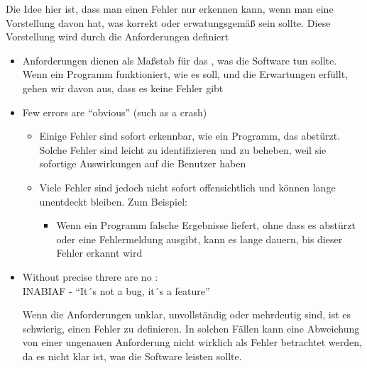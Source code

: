 \begin{defBox}[title=Detection an Error Presumes an Expectation (Requirement)]
    \begin{infoBox}
        Die Idee hier ist, dass man einen Fehler nur erkennen kann, wenn man eine Vorstellung davon hat, was korrekt oder erwatungsgemäß sein sollte. Diese Vorstellung wird durch die Anforderungen definiert
        \begin{itemize}
            \item {} Anforderungen dienen als Maßstab für das , was die Software tun sollte. Wenn ein Programm funktioniert, wie es soll, und die Erwartungen erfüllt, gehen wir davon aus, dass es keine Fehler gibt
        \end{itemize}
    \end{infoBox}
    \begin{itemize}
        \item Few errors are \enquote{obvious} (such as a crash)
        \begin{infoBox}
            \begin{itemize}
                \item {} Einige Fehler sind sofort erkennbar, wie ein Programm, das abstürzt. Solche Fehler sind leicht zu identifizieren und zu beheben, weil sie sofortige Auswirkungen auf die Benutzer haben
                \item {} Viele Fehler sind jedoch nicht sofort offensichtlich und können lange unentdeckt bleiben. Zum Beispiel:
                \begin{itemize}
                    \item {} Wenn ein Programm falsche Ergebnisse liefert, ohne dass es abstürzt oder eine Fehlermeldung ausgibt, kann es lange dauern, bis dieser Fehler erkannt wird
                \end{itemize}
            \end{itemize}
        \end{infoBox}
        \item Without precise  threre are no :\\
        INABIAF - \enquote{It´s not a bug, it´s a feature}
        \begin{infoBox}
            Wenn die Anforderungen unklar, unvollständig oder mehrdeutig sind, ist es schwierig, einen Fehler zu definieren. In solchen Fällen kann eine Abweichung von einer ungenauen Anforderung nicht wirklich als Fehler betrachtet werden, da es nicht klar ist, was die Software leisten sollte.

\end{infoBox}
\end{itemize}
\end{defBox}
